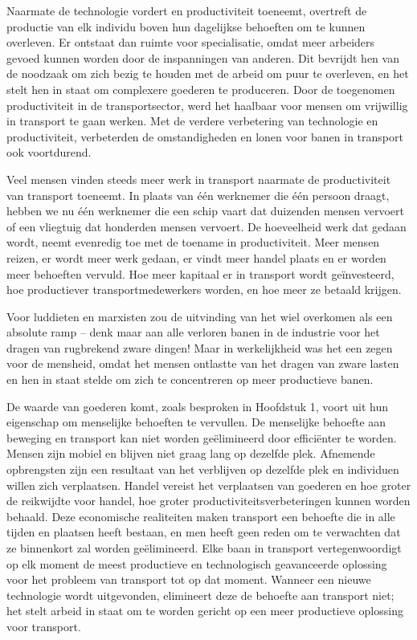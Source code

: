 \documentclass[
  a5paper,
  smalldemyvopaper,11pt,twoside,onecolumn,openright,extrafontsizes,
hidelinks]{memoir}
\begin{document}
Naarmate de technologie vordert en productiviteit toeneemt, overtreft de
productie van elk individu boven hun dagelijkse behoeften om te kunnen
overleven. Er ontstaat dan ruimte voor specialisatie, omdat meer
arbeiders gevoed kunnen worden door de inspanningen van anderen. Dit
bevrijdt hen van de noodzaak om zich bezig te houden met de arbeid om
puur te overleven, en het stelt hen in staat om complexere goederen te
produceren. Door de toegenomen productiviteit in de transportsector,
werd het haalbaar voor mensen om vrijwillig in transport te gaan werken.
Met de verdere verbetering van technologie en productiviteit,
verbeterden de omstandigheden en lonen voor banen in transport ook
voortdurend.

Veel mensen vinden steeds meer werk in transport naarmate de
productiviteit van transport toeneemt. In plaats van één werknemer die
één persoon draagt, hebben we nu één werknemer die een schip vaart dat
duizenden mensen vervoert of een vliegtuig dat honderden mensen
vervoert. De hoeveelheid werk dat gedaan wordt, neemt evenredig toe met
de toename in productiviteit. Meer mensen reizen, er wordt meer werk
gedaan, er vindt meer handel plaats en er worden meer behoeften vervuld.
Hoe meer kapitaal er in transport wordt geïnvesteerd, hoe productiever
transportmedewerkers worden, en hoe meer ze betaald krijgen.

Voor luddieten en marxisten zou de uitvinding van het wiel overkomen als
een absolute ramp -- denk maar aan alle verloren banen in de industrie
voor het dragen van rugbrekend zware dingen! Maar in werkelijkheid was
het een zegen voor de mensheid, omdat het mensen ontlastte van het
dragen van zware lasten en hen in staat stelde om zich te concentreren
op meer productieve banen.

De waarde van goederen komt, zoals besproken in Hoofdstuk 1, voort uit
hun eigenschap om menselijke behoeften te vervullen. De menselijke
behoefte aan beweging en transport kan niet worden geëlimineerd door
efficiënter te worden. Mensen zijn mobiel en blijven niet graag lang op
dezelfde plek. Afnemende opbrengsten zijn een resultaat van het
verblijven op dezelfde plek en individuen willen zich verplaatsen.
Handel vereist het verplaatsen van goederen en hoe groter de reikwijdte
voor handel, hoe groter productiviteitsverbeteringen kunnen worden
behaald. Deze economische realiteiten maken transport een behoefte die
in alle tijden en plaatsen heeft bestaan, en men heeft geen reden om te
verwachten dat ze binnenkort zal worden geëlimineerd. Elke baan in
transport vertegenwoordigt op elk moment de meest productieve en
technologisch geavanceerde oplossing voor het probleem van transport tot
op dat moment. Wanneer een nieuwe technologie wordt uitgevonden,
elimineert deze de behoefte aan transport niet; het stelt arbeid in
staat om te worden gericht op een meer productieve oplossing voor
transport.
\end{document}
